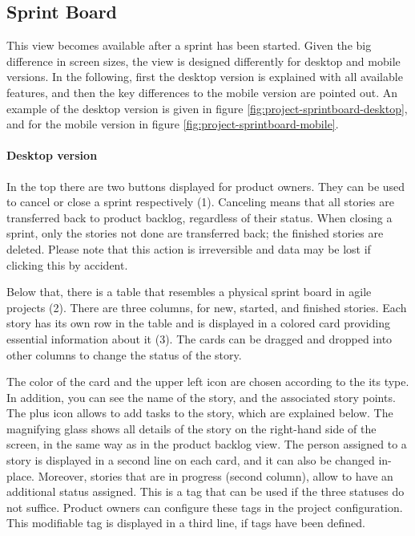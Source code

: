 \documentclass[
	accentcolor=tud1a %
]{tudreport}
\begin{document}
\subsection{Sprint Board}
\label{sec:sprint-board}


This view becomes available after a sprint has been started. Given the big difference in screen sizes, the view is designed differently for desktop and mobile versions. In the following, first the desktop version is explained with all available features, and then the key differences to the mobile version are pointed out. An example of the desktop version is given in figure \ref{fig:project-sprintboard-desktop}, and for the mobile version in figure \ref{fig:project-sprintboard-mobile}.

\paragraph{Desktop version}
In the top there are two buttons displayed for product owners. They can be used to cancel or close a sprint respectively (1). Canceling means that all stories are transferred back to product backlog, regardless of their status. When closing a sprint, only the stories not done are transferred back; the finished stories are deleted. Please note that this action is irreversible and data may be lost if clicking this by accident.

Below that, there is a table that resembles a physical sprint board in agile projects (2). There are three columns, for new, started, and finished stories. Each story has its own row in the table and is displayed in a colored card providing essential information about it (3). The cards can be dragged and dropped into other columns to change the status of the story.

The color of the card and the upper left icon are chosen according to the its type. In addition, you can see the name of the story, and the associated story points. The plus icon allows to add tasks to the story, which are explained below. The magnifying glass shows all details of the story on the right-hand side of the screen, in the same way as in the product backlog view. The person assigned to a story is displayed in a second line on each card, and it can also be changed in-place. Moreover, stories that are in progress (second column), allow to have an additional status assigned. This is a tag that can be used if the three statuses do not suffice. Product owners can configure these tags in the project configuration. This modifiable tag is displayed in a third line, if tags have been defined.
\end{document}

